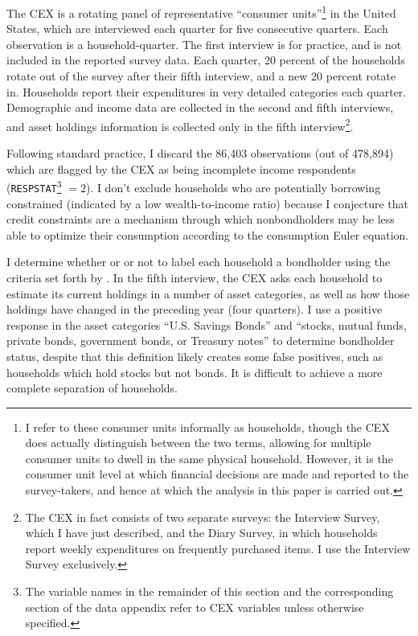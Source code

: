 The CEX is a rotating panel of representative ``consumer units''\footnote{I refer to these consumer units informally as households, though the CEX does actually distinguish between the two terms, allowing for multiple consumer units to dwell in the same physical household. However, it is the consumer unit level at which financial decisions are made and reported to the survey-takers, and hence at which the analysis in this paper is carried out.} in the United States, which are interviewed each quarter for five consecutive quarters. Each observation is a household-quarter. The first interview is for practice, and is not included in the reported survey data. Each quarter, 20 percent of the households rotate out of the survey after their fifth interview, and a new 20 percent rotate in. Households report their expenditures in very detailed categories each quarter. Demographic and income data are collected in the second and fifth interviews, and asset holdings information is collected only in the fifth interview\footnote{The CEX in fact consists of two separate surveys: the Interview Survey, which I have just described, and the Diary Survey, in which households report weekly expenditures on frequently purchased items. I use the Interview Survey exclusively.}.

Following standard practice, I discard the 86,403 observations (out of 478,894) which are flagged by the CEX as being incomplete income respondents (\texttt{RESPSTAT}\footnote{The variable names in the remainder of this section and the corresponding section of the data appendix refer to CEX variables unless otherwise specified.} $= 2$). I don't exclude households who are potentially borrowing constrained (indicated by a low wealth-to-income ratio) because I conjecture that credit constraints are a mechanism through which nonbondholders may be less able to optimize their consumption according to the consumption Euler equation.

I determine whether or or not to label each household a bondholder using the criteria set forth by \cite{vissing02}. In the fifth interview, the CEX asks each household to estimate its current holdings in a number of asset categories, as well as how those holdings have changed in the preceding year (four quarters). I use a positive response in the asset categories ``U.S. Savings Bonds'' and ``stocks, mutual funds, private bonds, government bonds, or Treasury notes'' to determine bondholder status, despite that this definition likely creates some false positives, such as households which hold stocks but not bonds. It is difficult to achieve a more complete separation of households.

